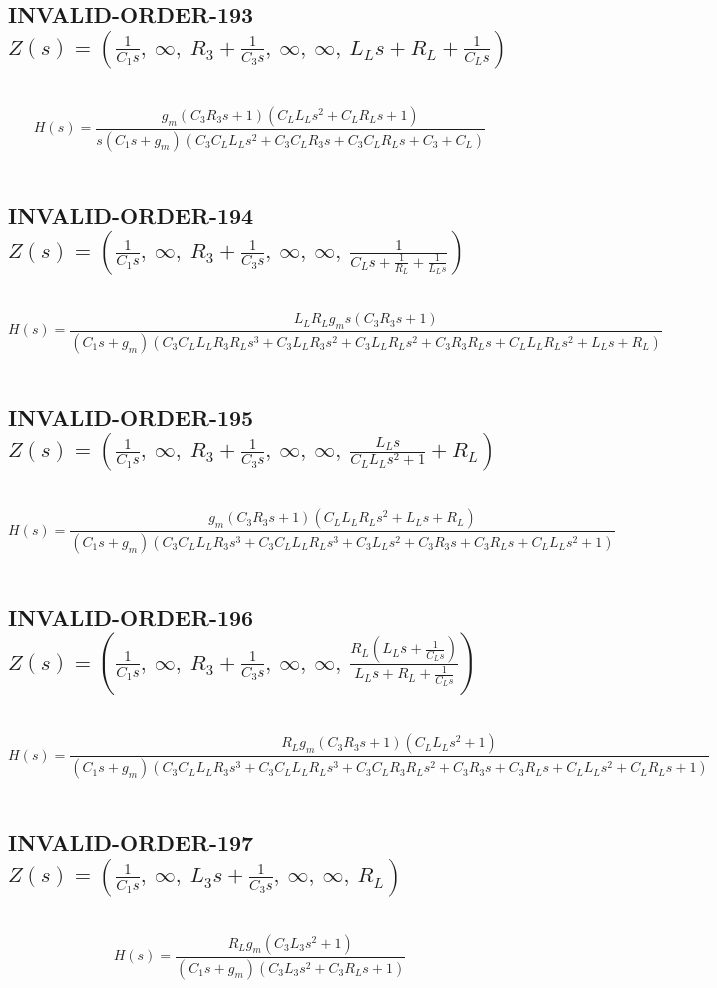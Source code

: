 \documentclass{article}
\begin{document}
\subsection{INVALID-ORDER-193 $Z(s) = \left( \frac{1}{C_{1} s}, \  \infty, \  R_{3} + \frac{1}{C_{3} s}, \  \infty, \  \infty, \  L_{L} s + R_{L} + \frac{1}{C_{L} s}\right)$ } \ 
\textbf{\[H(s) = \frac{g_{m} \left(C_{3} R_{3} s + 1\right) \left(C_{L} L_{L} s^{2} + C_{L} R_{L} s + 1\right)}{s \left(C_{1} s + g_{m}\right) \left(C_{3} C_{L} L_{L} s^{2} + C_{3} C_{L} R_{3} s + C_{3} C_{L} R_{L} s + C_{3} + C_{L}\right)}\] } \ 
\subsection{INVALID-ORDER-194 $Z(s) = \left( \frac{1}{C_{1} s}, \  \infty, \  R_{3} + \frac{1}{C_{3} s}, \  \infty, \  \infty, \  \frac{1}{C_{L} s + \frac{1}{R_{L}} + \frac{1}{L_{L} s}}\right)$ } \ 
\textbf{\[H(s) = \frac{L_{L} R_{L} g_{m} s \left(C_{3} R_{3} s + 1\right)}{\left(C_{1} s + g_{m}\right) \left(C_{3} C_{L} L_{L} R_{3} R_{L} s^{3} + C_{3} L_{L} R_{3} s^{2} + C_{3} L_{L} R_{L} s^{2} + C_{3} R_{3} R_{L} s + C_{L} L_{L} R_{L} s^{2} + L_{L} s + R_{L}\right)}\] } \ 
\subsection{INVALID-ORDER-195 $Z(s) = \left( \frac{1}{C_{1} s}, \  \infty, \  R_{3} + \frac{1}{C_{3} s}, \  \infty, \  \infty, \  \frac{L_{L} s}{C_{L} L_{L} s^{2} + 1} + R_{L}\right)$ } \ 
\textbf{\[H(s) = \frac{g_{m} \left(C_{3} R_{3} s + 1\right) \left(C_{L} L_{L} R_{L} s^{2} + L_{L} s + R_{L}\right)}{\left(C_{1} s + g_{m}\right) \left(C_{3} C_{L} L_{L} R_{3} s^{3} + C_{3} C_{L} L_{L} R_{L} s^{3} + C_{3} L_{L} s^{2} + C_{3} R_{3} s + C_{3} R_{L} s + C_{L} L_{L} s^{2} + 1\right)}\] } \ 
\subsection{INVALID-ORDER-196 $Z(s) = \left( \frac{1}{C_{1} s}, \  \infty, \  R_{3} + \frac{1}{C_{3} s}, \  \infty, \  \infty, \  \frac{R_{L} \left(L_{L} s + \frac{1}{C_{L} s}\right)}{L_{L} s + R_{L} + \frac{1}{C_{L} s}}\right)$ } \ 
\textbf{\[H(s) = \frac{R_{L} g_{m} \left(C_{3} R_{3} s + 1\right) \left(C_{L} L_{L} s^{2} + 1\right)}{\left(C_{1} s + g_{m}\right) \left(C_{3} C_{L} L_{L} R_{3} s^{3} + C_{3} C_{L} L_{L} R_{L} s^{3} + C_{3} C_{L} R_{3} R_{L} s^{2} + C_{3} R_{3} s + C_{3} R_{L} s + C_{L} L_{L} s^{2} + C_{L} R_{L} s + 1\right)}\] } \ 
\subsection{INVALID-ORDER-197 $Z(s) = \left( \frac{1}{C_{1} s}, \  \infty, \  L_{3} s + \frac{1}{C_{3} s}, \  \infty, \  \infty, \  R_{L}\right)$ } \ 
\textbf{\[H(s) = \frac{R_{L} g_{m} \left(C_{3} L_{3} s^{2} + 1\right)}{\left(C_{1} s + g_{m}\right) \left(C_{3} L_{3} s^{2} + C_{3} R_{L} s + 1\right)}\] } \ 
\end{document}
